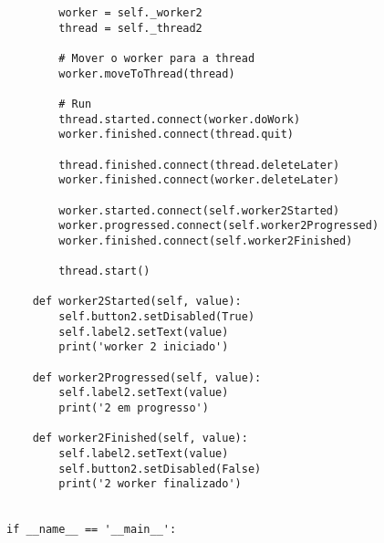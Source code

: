 \documentclass[12pt,a4paper]{article}
\begin{document}
\begin{lstlisting}
        worker = self._worker2
        thread = self._thread2

        # Mover o worker para a thread
        worker.moveToThread(thread)

        # Run
        thread.started.connect(worker.doWork)
        worker.finished.connect(thread.quit)

        thread.finished.connect(thread.deleteLater)
        worker.finished.connect(worker.deleteLater)

        worker.started.connect(self.worker2Started)
        worker.progressed.connect(self.worker2Progressed)
        worker.finished.connect(self.worker2Finished)

        thread.start()

    def worker2Started(self, value):
        self.button2.setDisabled(True)
        self.label2.setText(value)
        print('worker 2 iniciado')

    def worker2Progressed(self, value):
        self.label2.setText(value)
        print('2 em progresso')

    def worker2Finished(self, value):
        self.label2.setText(value)
        self.button2.setDisabled(False)
        print('2 worker finalizado')


if __name__ == '__main__':
    \end{lstlisting}
\end{document}

